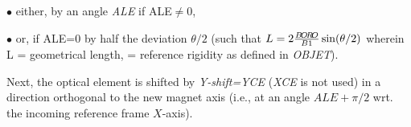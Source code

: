  $\bullet$ either,  by an angle \textsl{ALE}  if ALE$\not =$0, 

 $\bullet$ or, if ALE=0  by  half the deviation $\theta/2$ (such that $ L = 
2 \frac{B\!O\!R\!O}{B1} \sin({\theta}/{2})$ wherein L = geometrical length, 
\BORO  = reference rigidity as defined in \textsl{OBJET}).

\noindent Next, the optical element is  shifted by \textsl{Y-shift=YCE} (\textsl{XCE} is not used) in a 
direction orthogonal to the new magnet axis (i.e., at an angle $ALE+\pi/2$ wrt. the incoming 
reference frame $X$-axis). 


\vfill

